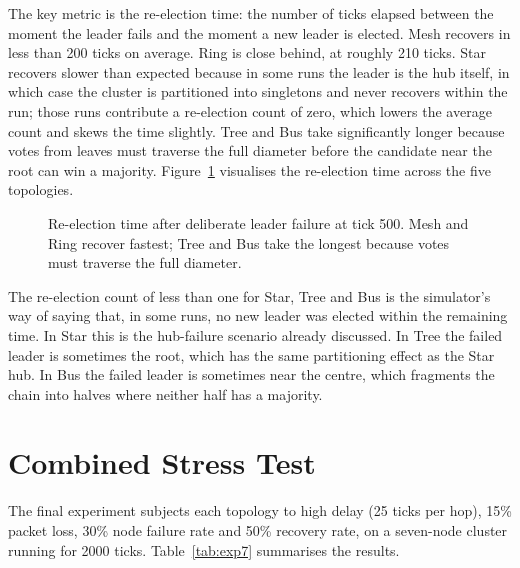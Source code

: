 The key metric is the re-election time: the number of ticks elapsed between the moment the leader fails and the moment a new leader is elected. Mesh recovers in less than 200 ticks on average. Ring is close behind, at roughly 210 ticks. Star recovers slower than expected because in some runs the leader is the hub itself, in which case the cluster is partitioned into singletons and never recovers within the run; those runs contribute a re-election count of zero, which lowers the average count and skews the time slightly. Tree and Bus take significantly longer because votes from leaves must traverse the full diameter before the candidate near the root can win a majority. Figure~\ref{fig:exp6_reelection} visualises the re-election time across the five topologies.

\begin{figure}[H]
\centering
{}
\caption{Re-election time after deliberate leader failure at tick 500. Mesh and Ring recover fastest; Tree and Bus take the longest because votes must traverse the full diameter.}
\label{fig:exp6_reelection}
\end{figure}

The re-election count of less than one for Star, Tree and Bus is the simulator's way of saying that, in some runs, no new leader was elected within the remaining time. In Star this is the hub-failure scenario already discussed. In Tree the failed leader is sometimes the root, which has the same partitioning effect as the Star hub. In Bus the failed leader is sometimes near the centre, which fragments the chain into halves where neither half has a majority.

\section{Combined Stress Test}

The final experiment subjects each topology to high delay (25 ticks per hop), 15\% packet loss, 30\% node failure rate and 50\% recovery rate, on a seven-node cluster running for 2000 ticks. Table~\ref{tab:exp7} summarises the results.

